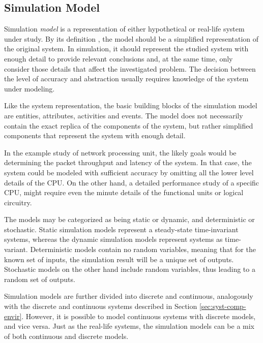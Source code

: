 \subsection{Simulation Model}
\label{sec:simulation-model}

Simulation \emph{model} is a representation of either hypothetical or real-life system under study. By its definition \cite{Encyclopedia of computer science}, the model should be a simplified representation of the original system. In simulation, it should represent the studied system with enough detail to provide relevant conclusions and, at the same time, only consider those details that affect the investigated problem. The decision between the level of accuracy and abstraction usually requires knowledge of the system under modeling. \cite{Banks:2010:DES}

Like the system representation, the basic building blocks of the simulation model are entities, attributes, activities and events. The model does not necessarily contain the exact replica of the components of the system, but rather simplified components that represent the system with enough detail. \cite{Banks:2010:DES}

In the example study of network processing unit, the likely goals would be determining the packet throughput and latency of the system. In that case, the system could be modeled with sufficient accuracy by omitting all the lower level details of the CPU. On the other hand, a detailed performance study of a specific CPU, might require even the minute details of the functional units or logical circuitry. \cite{TODO: find some simulation example for this}

The models may be categorized as being static or dynamic, and deterministic or stochastic. Static simulation models represent a steady-state time-invariant systems, whereas the dynamic simulation models represent systems as time-variant. Deterministic models contain no random variables, meaning that for the known set of inputs, the simulation result will be a unique set of outputs. Stochastic models on the other hand include random variables, thus leading to a random set of outputs. \cite{Banks:2010:DES}

Simulation models are further divided into discrete and continuous, analogously with the discrete and continuous systems described in Section \ref{sec:syst-comp-envir}. However, it is possible to model continuous systems with discrete models, and vice versa. Just as the real-life systems, the simulation models can be a mix of both continuous and discrete models.  \cite{Banks:2010:DES}

